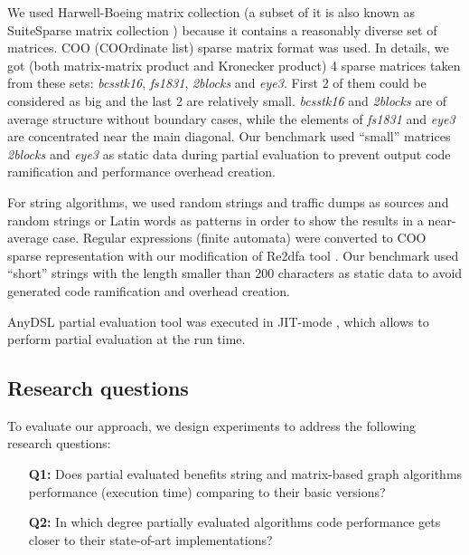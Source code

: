 \documentclass[conference]{IEEEtran}
\begin{document}
We used Harwell-Boeing matrix collection \cite{duff1992users} (a subset of it is also known as SuiteSparse matrix collection \cite{davis2011university}) because it contains a reasonably diverse set of matrices. COO (COOrdinate list) sparse matrix format was used. In details, we got (both matrix-matrix product and Kronecker product) 4 sparse matrices taken from these sets: \textit{bcsstk16}, \textit{fs1831}, \textit{2blocks} and \textit{eye3}. First 2 of them could be considered as big and the last 2 are relatively small. \textit{bcsstk16} and \textit{2blocks} are of average structure without boundary cases, while  the elements of \textit{fs1831} and \textit{eye3} are concentrated near the main diagonal. Our benchmark used ``small'' matrices \textit{2blocks} and \textit{eye3} as static data during partial evaluation to prevent output code ramification and performance overhead creation.

For string algorithms, we used random strings and traffic dumps as sources and random strings or Latin words as patterns in order to show the results in a near-average case. Regular expressions (finite automata) were converted to COO sparse representation with our modification of Re2dfa tool \cite{re2dfa}. Our benchmark used ``short'' strings with the length smaller than 200 characters as static data to avoid generated code ramification and overhead creation.

AnyDSL partial evaluation tool was executed in JIT-mode \colorbox{red}{\cite{leissa2018anydsl}}, which allows to perform partial evaluation at the run time.



\subsection{Research questions}

To evaluate our approach, we design experiments to address the following research questions:

\begin{itemize}
	\item[\textbf{Q1:}] Does partial evaluated benefits string and matrix-based graph algorithms performance (execution time) comparing to their basic versions?
	\item[\textbf{Q2:}] In which degree partially evaluated algorithms code performance gets closer to their state-of-art implementations?
\end{itemize}
\end{document}
